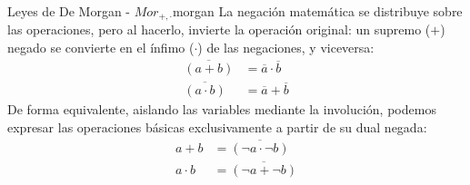 \begin{teorema}{Leyes de De Morgan - $Mor_{+, \cdot}$}{morgan}
La negación matemática se distribuye sobre las operaciones, pero al hacerlo, invierte la operación original: un supremo ($+$) negado se convierte en el ínfimo ($\cdot$) de las negaciones, y viceversa:
\begin{align}
    \overline{(a + b)} &= \overline{a} \cdot \overline{b} \\
    \overline{(a \cdot b)} &= \overline{a} + \overline{b} 
\end{align}
De forma equivalente, aislando las variables mediante la involución, podemos expresar las operaciones básicas exclusivamente a partir de su dual negada:
\begin{align}
    a + b &= \overline{(\neg a \cdot \neg b)} \\
    a \cdot b &= \overline{(\neg a + \neg b)} 
\end{align}
\end{teorema}
